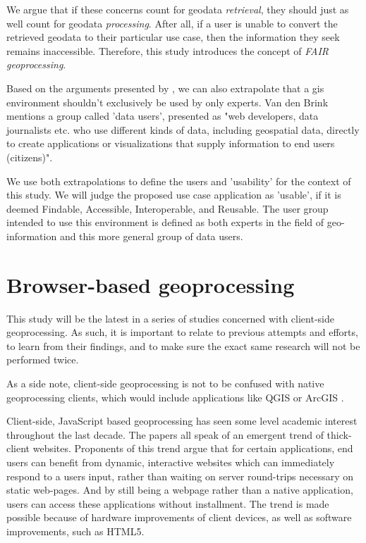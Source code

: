 We argue that if these concerns count for geodata \textit{retrieval}, they should just as well count for geodata \textit{processing}. After all, if a user is unable to convert the retrieved geodata to their particular use case, then the information they seek remains inaccessible. Therefore, this study introduces the concept of \emph{FAIR geoprocessing}. 

Based on the arguments presented by \cite{brink_geospatial_2018}, we can also extrapolate that a \ac{gis} environment shouldn't exclusively be used by only experts. Van den Brink mentions a group called 'data users', presented as "web developers, data journalists etc. who use different kinds of data, including geospatial data, directly to create applications or visualizations that supply information to end users (citizens)". 

We use both extrapolations to define the users and 'usability' for the context of this study. We will judge the proposed use case application as 'usable', if it is deemed Findable, Accessible, Interoperable, and Reusable. The user group intended to use this environment is defined as both experts in the field of geo-information and this more general group of data users.


\section{Browser-based geoprocessing}


This study will be the latest in a series of studies concerned with client-side geoprocessing. As such, it is important to relate to previous attempts and efforts, to learn from their findings, and to make sure the exact same research will not be performed twice. 

As a side note, client-side geoprocessing is not to be confused with native geoprocessing clients, which would include applications like QGIS \cite{qgis_community_qgis_2022}or ArcGIS \cite{esri_arcgis_2022}. 

Client-side, JavaScript based geoprocessing has seen some level academic interest throughout the last decade. The papers \cite{hamilton_client-side_2014, panidi_hybrid_2015, kulawiak_analysis_2019} all speak of an emergent trend of thick-client websites. Proponents of this trend argue that for certain applications, end users can benefit from dynamic, interactive websites which can immediately respond to a users input, rather than waiting on server round-trips necessary on static web-pages. And by still being a webpage rather than a native application, users can access these applications without installment. The trend is made possible because of hardware improvements of client devices, as well as software improvements, such as HTML5. 

